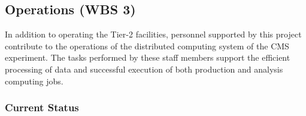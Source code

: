 \documentclass[11pt,a4paper]{article}
\begin{document}

\subsection{Operations (WBS 3)}

In addition to operating the Tier-2 facilities, personnel supported by this
project contribute to the operations of the distributed computing system of
the CMS experiment.  The tasks performed by these staff members support the
efficient processing of data and successful execution of both production
and analysis computing jobs.

\subsubsection{Current Status}
\end{document}

